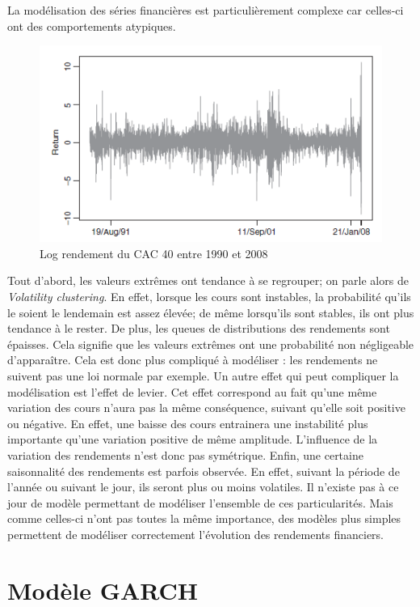 		La modélisation des séries financières est particulièrement complexe car celles-ci ont des comportements atypiques.

		\begin{figure}[h]
			\center
			\includegraphics{logRendementCAC40.png}
			\caption{Log rendement du CAC 40 entre 1990 et 2008}
			\label{log_rendement}
		\end{figure}

		Tout d'abord, les valeurs extrêmes ont tendance à se regrouper; on parle alors de \textit{Volatility clustering}. En effet, lorsque les cours sont instables, la probabilité qu'ils le soient le lendemain est assez élevée; de même lorsqu'ils sont stables, ils ont plus tendance à le rester.
		De plus, les queues de distributions des rendements sont épaisses. Cela signifie que les valeurs extrêmes ont une probabilité non négligeable d'apparaître. Cela est donc plus compliqué à modéliser : les rendements ne suivent pas une loi normale par exemple.
		Un autre effet qui peut compliquer la modélisation est l'effet de levier. Cet effet correspond au fait qu'une même variation des cours n'aura pas la même conséquence, suivant qu'elle soit positive ou négative. En effet, une baisse des cours entrainera une instabilité plus importante qu'une variation positive de même amplitude. L'influence de la variation des rendements n'est donc pas symétrique.
		Enfin, une certaine saisonnalité des rendements est parfois observée. En effet, suivant la période de l'année ou suivant le jour, ils seront plus ou moins volatiles.
		Il n'existe pas à ce jour de modèle permettant de modéliser l'ensemble de ces particularités. Mais comme celles-ci n'ont pas toutes la même importance, des modèles plus simples permettent de modéliser correctement l'évolution des rendements financiers.


	\section{Modèle GARCH}


